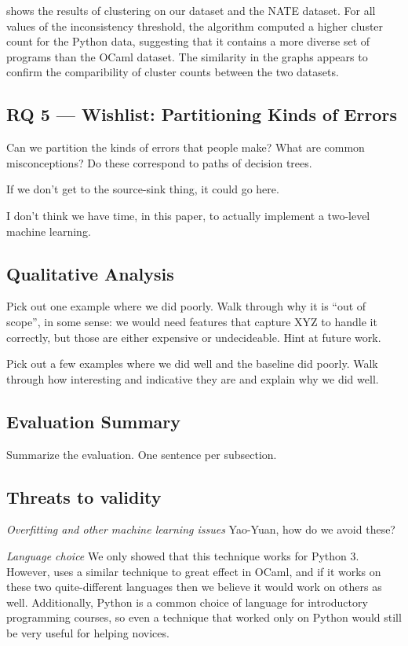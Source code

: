 \documentclass[conference]{IEEEtran}
\begin{document}
 shows the results of clustering on our dataset and the NATE
dataset. For all values of the inconsistency threshold, the algorithm computed a
higher cluster count for the Python data, suggesting that it contains a more
diverse set of programs than the OCaml dataset. The similarity in the graphs
appears to confirm the comparibility of cluster counts between the two datasets.

\subsection{RQ 5 --- Wishlist: Partitioning Kinds of Errors}

Can we partition the kinds of errors that people make? What are common
misconceptions? Do these correspond to paths of decision trees.

If we don't get to the source-sink thing, it could go here.

I don't think we have time, in this paper, to actually implement a
two-level machine learning.

\subsection{Qualitative Analysis}

Pick out one example where we did poorly. Walk through why it is ``out of
scope'', in some sense: we would need features that capture XYZ to handle
it correctly, but those are either expensive or undecideable. Hint at
future work.

Pick out a few examples where we did well and the baseline did poorly. Walk
through how interesting and indicative they are and explain why we did well.

\subsection{Evaluation Summary}

Summarize the evaluation. One sentence per subsection.

\subsection{Threats to validity}
\label{sec-threats}

\emph{Overfitting and other machine learning issues} Yao-Yuan, how do we avoid
these?

\emph{Language choice} We only showed that this technique works for Python 3.
However, \cite{learning-to-blame} uses a similar technique to great effect in
OCaml, and if it works on these two quite-different languages then we believe
it would work on others as well. Additionally, Python is a common choice of
language for introductory programming courses, so even a technique that worked
only on Python would still be very useful for helping novices.
\end{document}
